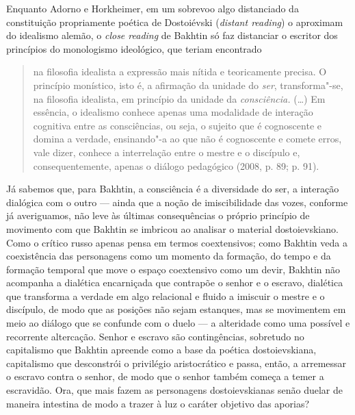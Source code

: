 Enquanto Adorno e Horkheimer, em um sobrevoo algo distanciado da
constituição propriamente poética de Dostoiévski (\emph{distant
reading}) o aproximam do idealismo alemão, o \emph{close reading} de
Bakhtin só faz distanciar o escritor dos princípios do monologismo
ideológico, que teriam encontrado

\begin{quote}
na filosofia idealista a expressão mais nítida e teoricamente precisa. O
princípio monístico, isto é, a afirmação da unidade do \emph{ser},
transforma"-se, na filosofia idealista, em princípio da unidade da
\emph{consciência.} (\ldots) Em essência, o idealismo conhece apenas uma
modalidade de interação cognitiva entre as consciências, ou seja, o
sujeito que é cognoscente e domina a verdade, ensinando"-a ao que não é
cognoscente e comete erros, vale dizer, conhece a interrelação entre o
mestre e o discípulo e, consequentemente, apenas o diálogo pedagógico
(2008, p. 89; p. 91).
\end{quote}

Já sabemos que, para Bakhtin, a consciência é a diversidade do ser, a
interação dialógica com o outro --- ainda que a noção de imiscibilidade
das vozes, conforme já averiguamos, não leve às últimas consequências o
próprio princípio de movimento com que Bakhtin se imbricou ao analisar o
material dostoievskiano. Como o crítico russo apenas pensa em termos
coextensivos; como Bakhtin veda a coexistência das personagens como um
momento da formação, do tempo e da formação temporal que move o espaço
coextensivo como um devir, Bakhtin não acompanha a dialética encarniçada
que contrapõe o senhor e o escravo, dialética que transforma a verdade
em algo relacional e fluido a imiscuir o mestre e o discípulo, de modo
que as posições não sejam estanques, mas se movimentem em meio ao
diálogo que se confunde com o duelo --- a alteridade como uma possível e
recorrente altercação. Senhor e escravo são contingências, sobretudo no
capitalismo que Bakhtin apreende como a base da poética dostoievskiana,
capitalismo que desconstrói o privilégio aristocrático e passa, então, a
arremessar o escravo contra o senhor, de modo que o senhor também começa
a temer a escravidão. Ora, que mais fazem as personagens dostoievskianas
senão duelar de maneira intestina de modo a trazer à luz o caráter
objetivo das aporias?


